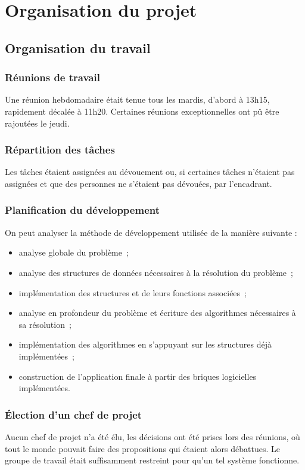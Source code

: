 \chapter{Organisation du projet}

  \section{Organisation du travail}

    \subsection{Réunions de travail}
Une réunion hebdomadaire était tenue tous les mardis, d'abord à 13h15, rapidement décalée à 11h20. Certaines réunions exceptionnelles ont pû être rajoutées le jeudi.

    \subsection{Répartition des tâches}
Les tâches étaient assignées au dévouement ou, si certaines tâches n'étaient pas assignées et que des personnes ne s'étaient pas dévouées, par l'encadrant.

    \subsection{Planification du développement}
On peut analyser la méthode de développement utilisée de la manière suivante :
\begin{itemize}
	\item analyse globale du problème~;
	\item analyse des structures de données nécessaires à la résolution du problème~;
	\item implémentation des structures et de leurs fonctions associées~;
	\item analyse en profondeur du problème et écriture des algorithmes nécessaires à sa résolution~;
	\item implémentation des algorithmes en s'appuyant sur les structures déjà implémentées~;
	\item construction de l'application finale à partir des briques logicielles implémentées.
\end{itemize}

    \subsection{Élection d’un chef de projet}
Aucun chef de projet n'a été élu, les décisions ont été prises lors des réunions, où tout le monde pouvait faire des propositions qui étaient alors débattues.
Le groupe de travail était suffisamment restreint pour qu'un tel système fonctionne.

